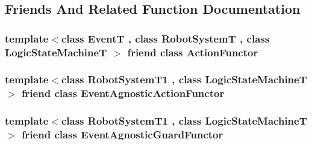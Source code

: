 \subsection{Friends And Related Function Documentation}
\hypertarget{classLogicStateMachineFrontEnd_a05673eb4ec343f36c1f3fb787ac26b94}{
\subsubsection[{Action\-Functor}]{\setlength{\rightskip}{0pt plus 5cm}template$<$class Event\-T , class Robot\-System\-T , class Logic\-State\-Machine\-T $>$ friend class {\bf Action\-Functor}\hspace{0.3cm}{\ttfamily [friend]}}}\label{classLogicStateMachineFrontEnd_a05673eb4ec343f36c1f3fb787ac26b94}
\hypertarget{classLogicStateMachineFrontEnd_a86a665e36420c3cbc2b45864e023f98a}{
\subsubsection[{Event\-Agnostic\-Action\-Functor}]{\setlength{\rightskip}{0pt plus 5cm}template$<$class Robot\-System\-T1 , class Logic\-State\-Machine\-T $>$ friend class {\bf Event\-Agnostic\-Action\-Functor}\hspace{0.3cm}{\ttfamily [friend]}}}\label{classLogicStateMachineFrontEnd_a86a665e36420c3cbc2b45864e023f98a}
\hypertarget{classLogicStateMachineFrontEnd_af372c36475bc4510af791f5cb66608ad}{
\subsubsection[{Event\-Agnostic\-Guard\-Functor}]{\setlength{\rightskip}{0pt plus 5cm}template$<$class Robot\-System\-T1 , class Logic\-State\-Machine\-T $>$ friend class {\bf Event\-Agnostic\-Guard\-Functor}\hspace{0.3cm}{\ttfamily [friend]}}}\label{classLogicStateMachineFrontEnd_af372c36475bc4510af791f5cb66608ad}

